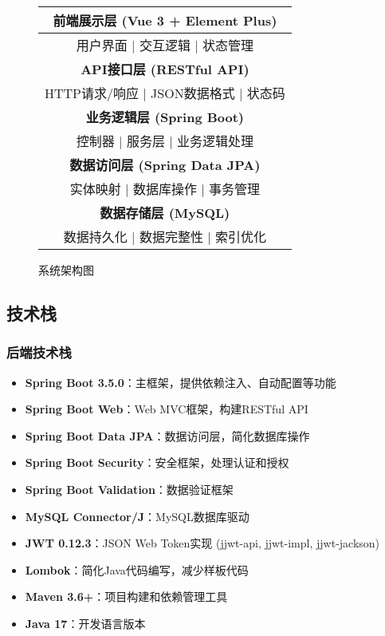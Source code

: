 \documentclass[12pt,a4paper]{article}
\begin{document}
\begin{figure}[H]
\centering
\begin{tabular}{|c|}
\hline
\textbf{前端展示层 (Vue 3 + Element Plus)} \\
\hline
用户界面 | 交互逻辑 | 状态管理 \\
\hline
\hline
\textbf{API接口层 (RESTful API)} \\
\hline
HTTP请求/响应 | JSON数据格式 | 状态码 \\
\hline
\hline
\textbf{业务逻辑层 (Spring Boot)} \\
\hline
控制器 | 服务层 | 业务逻辑处理 \\
\hline
\hline
\textbf{数据访问层 (Spring Data JPA)} \\
\hline
实体映射 | 数据库操作 | 事务管理 \\
\hline
\hline
\textbf{数据存储层 (MySQL)} \\
\hline
数据持久化 | 数据完整性 | 索引优化 \\
\hline
\end{tabular}
\caption{系统架构图}
\end{figure}

\subsection{技术栈}

\subsubsection{后端技术栈}
\begin{itemize}
    \item \textbf{Spring Boot 3.5.0}：主框架，提供依赖注入、自动配置等功能
    \item \textbf{Spring Boot Web}：Web MVC框架，构建RESTful API
    \item \textbf{Spring Boot Data JPA}：数据访问层，简化数据库操作
    \item \textbf{Spring Boot Security}：安全框架，处理认证和授权
    \item \textbf{Spring Boot Validation}：数据验证框架
    \item \textbf{MySQL Connector/J}：MySQL数据库驱动
    \item \textbf{JWT 0.12.3}：JSON Web Token实现 (jjwt-api, jjwt-impl, jjwt-jackson)
    \item \textbf{Lombok}：简化Java代码编写，减少样板代码
    \item \textbf{Maven 3.6+}：项目构建和依赖管理工具
    \item \textbf{Java 17}：开发语言版本
\end{itemize}
\end{document}
